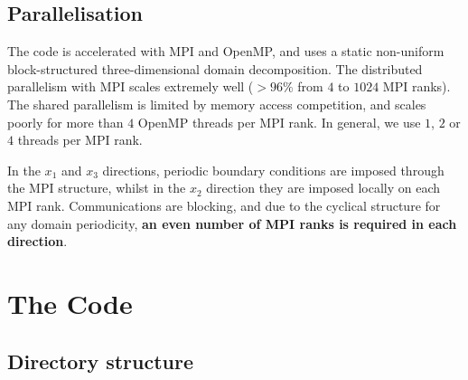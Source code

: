 \documentclass[notitlepage]{revtex4-1}
\begin{document}
\subsection{Parallelisation}

The code is accelerated with MPI and OpenMP, and uses a static non-uniform block-structured three-dimensional domain decomposition. The distributed parallelism with MPI scales extremely well ($>96\%$ from $4$ to $1024$ MPI ranks). The shared parallelism is limited by memory access competition, and scales poorly for more than $4$ OpenMP threads per MPI rank. In general, we use $1$, $2$ or $4$ threads per MPI rank.

In the $x_{1}$ and $x_{3}$ directions, periodic boundary conditions are imposed through the MPI structure, whilst in the $x_{2}$ direction they are imposed locally on each MPI rank. Communications are blocking, and due to the cyclical structure for any domain periodicity, \textbf{an even number of MPI ranks is required in each direction}.


\section{The Code}

\subsection{Directory structure}
\end{document}
